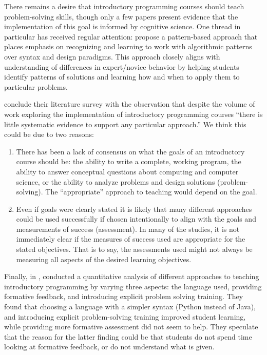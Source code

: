 \documentclass[12pt]{article}
\begin{document}
There remains a desire that introductory programming courses should
teach problem-solving skills, though only a few papers present
evidence that the implementation of this goal is informed by cognitive
science\autocite{kramarski_cognitivemetacognitive_1997,reed_incorporating_1998,muller_supporting_2008}. One
thread in particular has received regular attention:
\citeauthor{east_patternbased_1996} propose a pattern-based approach
that places emphasis on recognizing and learning to work with
algorithmic patterns over syntax and design
paradigms\autocite{east_patternbased_1996}. This approach closely
aligns with understanding of differences in expert/novice behavior by
helping students identify patterns of solutions and learning how and
when to apply them to particular
problems\autocite{east_patternbased_1996,muller_pattern_2005,wallingford_first_1996,reed_incorporating_1998}.

\citeauthor{pears_survey_2007-1} conclude their
\citeyear{pears_survey_2007-1} literature survey with the observation
that despite the volume of work exploring the implementation of
introductory programming courses “there is little systematic evidence
to support any particular approach.”\autocite{pears_survey_2007-1}
We think this could be due to two reasons:

\begin{enumerate}
\item There has been a lack of consensus on what the goals of an
  introductory course should be: the ability to write a complete,
  working program, the ability to answer conceptual questions about
  computing and computer science, or the ability to analyze problems
  and design solutions (problem-solving). The “appropriate” approach
  to teaching would depend on the goal.

\item Even if goals were clearly stated it is likely that many
  different approaches could be used successfully if chosen
  intentionally to align with the goals and measurements of success
  (assessment). In many of the studies, it is not immediately clear if
  the measures of success used are appropriate for the stated
  objectives. That is to say, the assessments used might not always be
  measuring all aspects of the desired learning objectives.
\end{enumerate}

Finally, in \citeyear{koulouri_teaching_2014},
\citeauthor{koulouri_teaching_2014} conducted a quantitative analysis
of different approaches to teaching introductory programming by
varying three aspects: the language used, providing formative
feedback, and introducing explicit problem solving
training\autocite{koulouri_teaching_2014}. They found that choosing a
language with a simpler syntax (Python instead of Java), and
introducing explicit problem-solving training improved student
learning, while providing more formative assessment did not seem to
help. They speculate that the reason for the latter finding could be
that students do not spend time looking at formative feedback, or do
not understand what is given.
\end{document}
